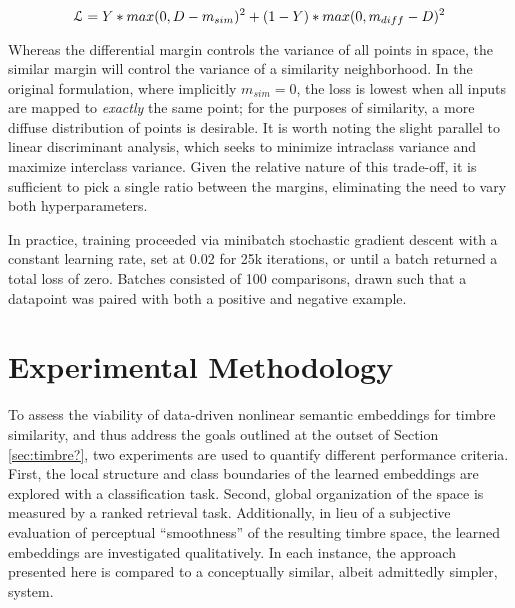 \begin{equation}
\mathcal{L} = Y * max(0, D - m_{sim})^2 + (1 - Y) * max(0, m_{diff} - D)^2 \\
\end{equation}

Whereas the differential margin controls the variance of all points in space, the similar margin will control the variance of a similarity neighborhood.
In the original formulation, where implicitly $m_{sim} = 0$, the loss is lowest when all inputs are mapped to \emph{exactly} the same point; for the purposes of similarity, a more diffuse distribution of points is desirable.
It is worth noting the slight parallel to linear discriminant analysis, which seeks to minimize intraclass variance and maximize interclass variance.
Given the relative nature of this trade-off, it is sufficient to pick a single ratio between the margins, eliminating the need to vary both hyperparameters.


In practice, training proceeded via minibatch stochastic gradient descent with a constant learning rate, set at 0.02 for 25k iterations, or until a batch returned a total loss of zero.
Batches consisted of 100 comparisons, drawn such that a datapoint was paired with both a positive and negative example.


\section{Experimental Methodology}
\label{sec:example}


To assess the viability of data-driven nonlinear semantic embeddings for timbre similarity, and thus address the goals outlined at the outset of Section \ref{sec:timbre?}, two experiments are used to quantify different performance criteria.
First, the local structure and class boundaries of the learned embeddings are explored with a classification task.
Second, global organization of the space is measured by a ranked retrieval task.
Additionally, in lieu of a subjective evaluation of perceptual ``smoothness'' of the resulting timbre space, the learned embeddings are investigated qualitatively.
In each instance, the approach presented here is compared to a conceptually similar, albeit admittedly simpler, system.


